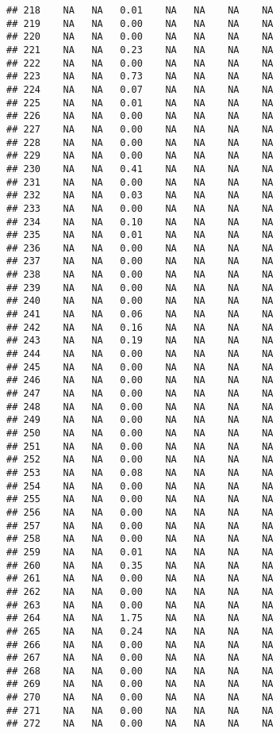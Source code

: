 \documentclass{article}\usepackage{graphicx, color}
\makeatletter
\newenvironment{kframe}{%
 \def\at@end@of@kframe{}%
 \ifinner\ifhmode%
  \def\at@end@of@kframe{\end{minipage}}%
  \begin{minipage}{\columnwidth}%
 \fi\fi%
 \def\FrameCommand##1{\hskip\@totalleftmargin \hskip-\fboxsep
 \colorbox{shadecolor}{##1}\hskip-\fboxsep
     \hskip-\linewidth \hskip-\@totalleftmargin \hskip\columnwidth}%
 \MakeFramed {\advance\hsize-\width
   \@totalleftmargin\z@ \linewidth\hsize
   \@setminipage}}%
 {\par\unskip\endMakeFramed%
 \at@end@of@kframe}
\newenvironment{knitrout}{}{} %
\makeatother
\begin{document}
\begin{knitrout}
\begin{kframe}
\begin{verbatim}
## 218    NA   NA   0.01    NA   NA    NA    NA
## 219    NA   NA   0.00    NA   NA    NA    NA
## 220    NA   NA   0.00    NA   NA    NA    NA
## 221    NA   NA   0.23    NA   NA    NA    NA
## 222    NA   NA   0.00    NA   NA    NA    NA
## 223    NA   NA   0.73    NA   NA    NA    NA
## 224    NA   NA   0.07    NA   NA    NA    NA
## 225    NA   NA   0.01    NA   NA    NA    NA
## 226    NA   NA   0.00    NA   NA    NA    NA
## 227    NA   NA   0.00    NA   NA    NA    NA
## 228    NA   NA   0.00    NA   NA    NA    NA
## 229    NA   NA   0.00    NA   NA    NA    NA
## 230    NA   NA   0.41    NA   NA    NA    NA
## 231    NA   NA   0.00    NA   NA    NA    NA
## 232    NA   NA   0.03    NA   NA    NA    NA
## 233    NA   NA   0.00    NA   NA    NA    NA
## 234    NA   NA   0.10    NA   NA    NA    NA
## 235    NA   NA   0.01    NA   NA    NA    NA
## 236    NA   NA   0.00    NA   NA    NA    NA
## 237    NA   NA   0.00    NA   NA    NA    NA
## 238    NA   NA   0.00    NA   NA    NA    NA
## 239    NA   NA   0.00    NA   NA    NA    NA
## 240    NA   NA   0.00    NA   NA    NA    NA
## 241    NA   NA   0.06    NA   NA    NA    NA
## 242    NA   NA   0.16    NA   NA    NA    NA
## 243    NA   NA   0.19    NA   NA    NA    NA
## 244    NA   NA   0.00    NA   NA    NA    NA
## 245    NA   NA   0.00    NA   NA    NA    NA
## 246    NA   NA   0.00    NA   NA    NA    NA
## 247    NA   NA   0.00    NA   NA    NA    NA
## 248    NA   NA   0.00    NA   NA    NA    NA
## 249    NA   NA   0.00    NA   NA    NA    NA
## 250    NA   NA   0.00    NA   NA    NA    NA
## 251    NA   NA   0.00    NA   NA    NA    NA
## 252    NA   NA   0.00    NA   NA    NA    NA
## 253    NA   NA   0.08    NA   NA    NA    NA
## 254    NA   NA   0.00    NA   NA    NA    NA
## 255    NA   NA   0.00    NA   NA    NA    NA
## 256    NA   NA   0.00    NA   NA    NA    NA
## 257    NA   NA   0.00    NA   NA    NA    NA
## 258    NA   NA   0.00    NA   NA    NA    NA
## 259    NA   NA   0.01    NA   NA    NA    NA
## 260    NA   NA   0.35    NA   NA    NA    NA
## 261    NA   NA   0.00    NA   NA    NA    NA
## 262    NA   NA   0.00    NA   NA    NA    NA
## 263    NA   NA   0.00    NA   NA    NA    NA
## 264    NA   NA   1.75    NA   NA    NA    NA
## 265    NA   NA   0.24    NA   NA    NA    NA
## 266    NA   NA   0.00    NA   NA    NA    NA
## 267    NA   NA   0.00    NA   NA    NA    NA
## 268    NA   NA   0.00    NA   NA    NA    NA
## 269    NA   NA   0.00    NA   NA    NA    NA
## 270    NA   NA   0.00    NA   NA    NA    NA
## 271    NA   NA   0.00    NA   NA    NA    NA
## 272    NA   NA   0.00    NA   NA    NA    NA

\end{verbatim}
\end{kframe}
\end{knitrout}
\end{document}
